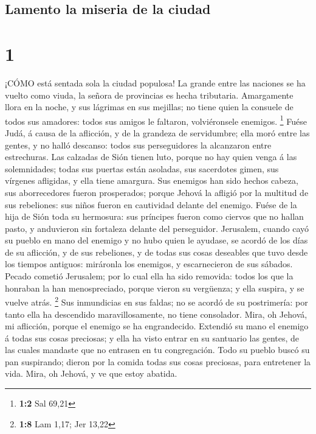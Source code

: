 \hypertarget{lamento-la-miseria-de-la-ciudad}{%
\subsection{Lamento la miseria de la
ciudad}\label{lamento-la-miseria-de-la-ciudad}}

\hypertarget{section}{%
\section{1}\label{section}}

 ¡CÓMO está sentada sola la ciudad populosa! La grande entre
las naciones se ha vuelto como viuda, la señora de provincias es hecha
tributaria.  Amargamente llora en la noche, y sus lágrimas
en sus mejillas; no tiene quien la consuele de todos sus amadores: todos
sus amigos le faltaron, volviéronsele enemigos. \footnote{\textbf{1:2}
  Sal 69,21}  Fuése Judá, á causa de la aflicción, y de la
grandeza de servidumbre; ella moró entre las gentes, y no halló
descanso: todos sus perseguidores la alcanzaron entre estrechuras.
 Las calzadas de Sión tienen luto, porque no hay quien venga
á las solemnidades; todas sus puertas están asoladas, sus sacerdotes
gimen, sus vírgenes afligidas, y ella tiene amargura.  Sus
enemigos han sido hechos cabeza, sus aborrecedores fueron prosperados;
porque Jehová la afligió por la multitud de sus rebeliones: sus niños
fueron en cautividad delante del enemigo.  Fuése de la hija
de Sión toda su hermosura: sus príncipes fueron como ciervos que no
hallan pasto, y anduvieron sin fortaleza delante del perseguidor.
 Jerusalem, cuando cayó su pueblo en mano del enemigo y no
hubo quien le ayudase, se acordó de los días de su aflicción, y de sus
rebeliones, y de todas sus cosas deseables que tuvo desde los tiempos
antiguos: miráronla los enemigos, y escarnecieron de sus sábados.
 Pecado cometió Jerusalem; por lo cual ella ha sido
removida: todos los que la honraban la han menospreciado, porque vieron
su vergüenza; y ella suspira, y se vuelve atrás. \footnote{\textbf{1:8}
  Lam 1,17; Jer 13,22}  Sus inmundicias en sus faldas; no se
acordó de su postrimería: por tanto ella ha descendido maravillosamente,
no tiene consolador. Mira, oh Jehová, mi aflicción, porque el enemigo se
ha engrandecido.  Extendió su mano el enemigo á todas sus
cosas preciosas; y ella ha visto entrar en su santuario las gentes, de
las cuales mandaste que no entrasen en tu congregación. 
Todo su pueblo buscó su pan suspirando; dieron por la comida todas sus
cosas preciosas, para entretener la vida. Mira, oh Jehová, y ve que
estoy abatida.

